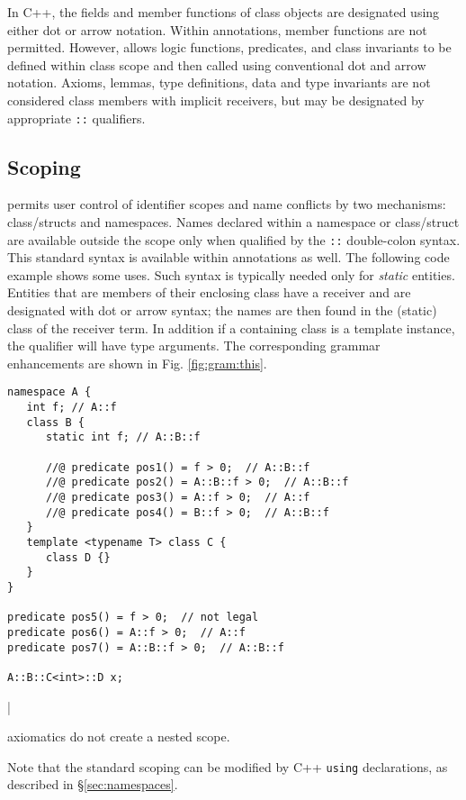 In C++, the fields and member functions of class objects are designated using 
either dot or arrow notation. Within \NAME annotations, \lang member functions are not
permitted. However, \NAME allows logic functions, predicates, and class invariants to be defined
within class scope and then called using conventional \lang dot and arrow notation.
Axioms, lemmas, type definitions, data and type invariants are not considered class members with implicit receivers,
but may be designated by appropriate \lstinline|::| qualifiers.

\subsection{Scoping}

\lang permits user control of identifier scopes and name conflicts by two mechanisms: class/structs and namespaces. 
Names declared within a namespace or class/struct are available outside the scope only when qualified by the
\lstinline|::| double-colon syntax. This standard \lang syntax is available within \NAME annotations as well.
The following code example shows some uses. Such syntax is typically needed only for \textit{static} entities.
Entities that are members of their enclosing class have a receiver and are designated with dot or arrow syntax;
the names are then found in the (static) class of the receiver term. In addition if a containing class is a template
instance, the qualifier will have type arguments. The corresponding grammar enhancements are shown in Fig. \ref{fig:gram:this}.
\begin{lstlisting}
namespace A {
   int f; // A::f
   class B {
      static int f; // A::B::f
      
      //@ predicate pos1() = f > 0;  // A::B::f
      //@ predicate pos2() = A::B::f > 0;  // A::B::f
      //@ predicate pos3() = A::f > 0;  // A::f
      //@ predicate pos4() = B::f > 0;  // A::B::f   
   }
   template <typename T> class C {
      class D {}
   }
}

predicate pos5() = f > 0;  // not legal
predicate pos6() = A::f > 0;  // A::f
predicate pos7() = A::B::f > 0;  // A::B::f

A::B::C<int>::D x;
\end{lstlisting}|

\NAME axiomatics do not create a nested scope.


Note that the standard scoping can be modified by C++ \lstinline|using| declarations, as described in \S\ref{sec:namespaces}.

